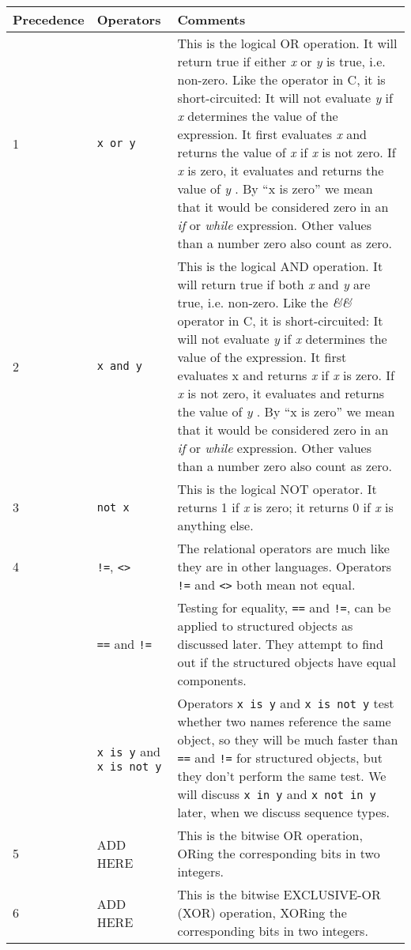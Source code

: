 \begin{longtable}{|l|l|p{7cm}|}
\toprule
Precedence & Operators & Comments \\
\midrule
  1 & \texttt{x or y} &  This is the logical OR operation.
It will return true if either \emph{x} or \emph{y} is true, i.e.
non-zero. Like the \emph{\textbar{}\textbar{}} operator in C, it is
short-circuited: It will not evaluate \emph{y} if \emph{x} determines
the value of the expression. It first evaluates \emph{x} and returns the
value of \emph{x} if \emph{x} is not zero. If \emph{x} is zero, it
evaluates and returns the value of \emph{y} . By ``x is zero'' we mean
that it would be considered zero in an \emph{if} or \emph{while}
expression. Other values than a number zero also count as zero. \\
%
\midrule
  2 & \texttt{x and y} & This is the logical AND operation.
It will return true if both \emph{x} and \emph{y} are true, i.e.
non-zero. Like the \emph{\&\&} operator in C, it is short-circuited: It
will not evaluate \emph{y} if \emph{x} determines the value of the
expression. It first evaluates x and returns \emph{x} if \emph{x} is
zero. If \emph{x} is not zero, it evaluates and returns the value of
\emph{y} . By ``x is zero'' we mean that it would be considered zero in
an \emph{if} or \emph{while} expression. Other values than a number zero
also count as zero. \\
%
\midrule
  3 & \texttt{not x} & This is the logical NOT operator. 
It returns 1 if \emph{x} is zero; it returns 0 if \emph{x} is anything
else. \\
%
\midrule
  4 & \verb"!=", \verb"<>"  & The relational operators are much
like they are in other languages. Operators \verb"!=" and \verb"<>" both mean not equal. \\
%
   & \verb"==" and \verb"!=" & Testing for equality, \verb"==" and \verb"!=", can be applied to structured objects as discussed later.
They attempt to find out if the structured objects have equal
components. \\
%
   & \verb"x is y" and \verb"x is not y"  & Operators \verb"x is y" and \verb"x is not y"
test whether two names reference the same object, so they will be much
faster than \verb"==" and \verb"!=" for structured objects, but they don't perform the
same test.  We will discuss \verb"x in y" and \verb"x not in y" later, when we discuss sequence types.\\
%
\midrule
  5 & ADD HERE &  This is the bitwise OR operation,
ORing the corresponding bits in two integers. \\
%
\midrule
  6  & ADD HERE & This is the bitwise EXCLUSIVE-OR (XOR) operation, XORing the corresponding bits in two integers. \\
%
\midrule


\end{longtable}
